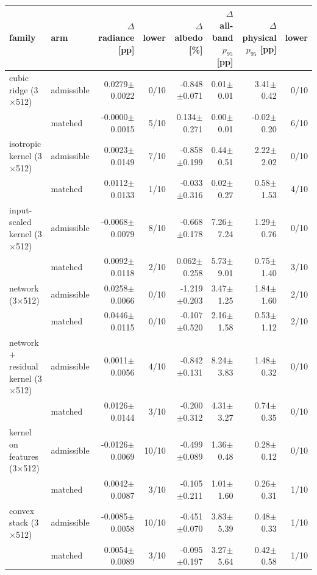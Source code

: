 \begin{tabular}{llrrrrrr}
\toprule
family & arm & $\Delta$ radiance [pp] & lower & $\Delta$ albedo [\%] & \thead{$\Delta$ all-band\\$p_{95}$ [pp]} & \thead{$\Delta$ physical\\$p_{95}$ [pp]} & lower \\
\midrule
cubic ridge (3$\times$512) & admissible & 0.0279$\pm$0.0022 & 0/10 & -0.848$\pm$0.071 & 0.01$\pm$0.01 & 3.41$\pm$0.42 & 0/10 \\
 & matched & -0.0000$\pm$0.0015 & 5/10 & 0.134$\pm$0.271 & 0.00$\pm$0.01 & -0.02$\pm$0.20 & 6/10 \\
isotropic kernel (3$\times$512) & admissible & 0.0023$\pm$0.0149 & 7/10 & -0.858$\pm$0.199 & 0.44$\pm$0.51 & 2.22$\pm$2.02 & 0/10 \\
 & matched & 0.0112$\pm$0.0133 & 1/10 & -0.033$\pm$0.316 & 0.02$\pm$0.27 & 0.58$\pm$1.53 & 4/10 \\
input-scaled kernel (3$\times$512) & admissible & -0.0068$\pm$0.0079 & 8/10 & -0.668$\pm$0.178 & 7.26$\pm$7.24 & 1.29$\pm$0.76 & 0/10 \\
 & matched & 0.0092$\pm$0.0118 & 2/10 & 0.062$\pm$0.258 & 5.73$\pm$9.01 & 0.75$\pm$1.40 & 3/10 \\
network (3$\times$512) & admissible & 0.0258$\pm$0.0066 & 0/10 & -1.219$\pm$0.203 & 3.47$\pm$1.25 & 1.84$\pm$1.60 & 2/10 \\
 & matched & 0.0446$\pm$0.0115 & 0/10 & -0.107$\pm$0.520 & 2.16$\pm$1.58 & 0.53$\pm$1.12 & 2/10 \\
network + residual kernel (3$\times$512) & admissible & 0.0011$\pm$0.0056 & 4/10 & -0.842$\pm$0.131 & 8.24$\pm$3.83 & 1.48$\pm$0.32 & 0/10 \\
 & matched & 0.0126$\pm$0.0144 & 3/10 & -0.200$\pm$0.312 & 4.31$\pm$3.27 & 0.74$\pm$0.35 & 0/10 \\
kernel on features (3$\times$512) & admissible & -0.0126$\pm$0.0069 & 10/10 & -0.499$\pm$0.089 & 1.36$\pm$0.48 & 0.28$\pm$0.12 & 0/10 \\
 & matched & 0.0042$\pm$0.0087 & 3/10 & -0.105$\pm$0.211 & 1.01$\pm$1.60 & 0.26$\pm$0.31 & 1/10 \\
convex stack (3$\times$512) & admissible & -0.0085$\pm$0.0058 & 10/10 & -0.451$\pm$0.070 & 3.83$\pm$5.39 & 0.48$\pm$0.33 & 1/10 \\
 & matched & 0.0054$\pm$0.0089 & 3/10 & -0.095$\pm$0.197 & 3.27$\pm$5.64 & 0.42$\pm$0.58 & 1/10 \\

\end{tabular}
